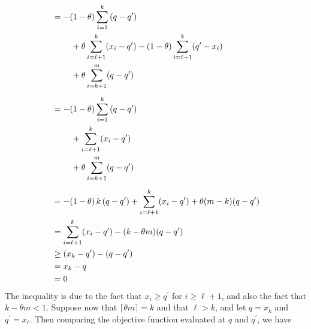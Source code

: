 \begin{align*}
  &= -(1 - \theta) \sum_{i=1}^k\, (q - q^{\prime}) \\
  &\hspace{8mm}
    + \theta \sum_{i=\ell+1}^k (x_i - q^{\prime})
    - (1 - \theta) \sum_{i=\ell+1}^k (q^{\prime} - x_i) \\
  &\hspace{8mm}
    + \theta \sum_{i=k+1}^m (q - q^{\prime}) \\[1ex]
  &= -(1 - \theta) \sum_{i=1}^k\, (q - q^{\prime}) \\
  &\hspace{8mm}
    + \sum_{i=\ell+1}^k (x_i - q^{\prime}) \\
  &\hspace{8mm}
    + \theta \sum_{i=k+1}^m (q - q^{\prime}) \\[1ex]
  & = - (1 - \theta)\, k\, (q - q^{\prime})
    + \sum_{i=\ell+1}^k (x_i - q^{\prime})
    + \theta (m - k) (q - q^{\prime}) \\
  &= \sum_{i=\ell+1}^k (x_i - q^{\prime}) - (k - \theta m) (q - q^{\prime}) \\
  &\geq (x_k - q^{\prime}) - (q - q^{\prime}) \\
  &= x_k - q \\
  &= 0
\end{align*}
The inequality is due to the fact that $x_i \geq q^{\prime}$ for
$i \geq \ell + 1$, and also the fact that $k - \theta m < 1$.  Suppose now that
$\lceil \theta m \rceil = k$ and that $\ell > k$, and let $q = x_k$ and
$q^{\prime} = x_{\ell}$.  Then comparing the objective function evaluated at $q$
and $q^{\prime}$, we have
